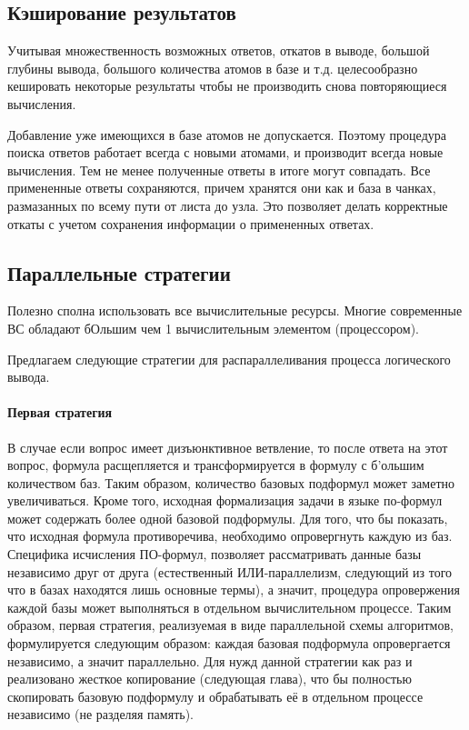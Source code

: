 \subsection{Кэширование результатов}
Учитывая множественность возможных ответов, откатов в выводе, большой глубины вывода, большого количества атомов в базе и т.д. целесообразно кешировать некоторые результаты чтобы не производить снова повторяющиеся вычисления.

Добавление уже имеющихся в базе атомов не допускается. Поэтому процедура поиска ответов работает всегда с новыми атомами, и производит всегда новые вычисления. Тем не менее полученные ответы в итоге могут совпадать. Все примененные ответы сохраняются, причем хранятся они как и база в чанках, размазанных по всему пути от листа до узла. Это позволяет делать корректные откаты с учетом сохранения информации о примененных ответах.

\subsection{Параллельные стратегии}
 
Полезно сполна использовать все вычислительные ресурсы. Многие современные ВС обладают бОльшим чем 1 вычислительным элементом (процессором).

Предлагаем следующие стратегии для распараллеливания процесса логического вывода.

\paragraph{Первая стратегия}

В случае если вопрос имеет дизъюнктивное ветвление, то после ответа на этот вопрос, формула расщепляется и трансформируется в формулу с б'ольшим количеством баз. Таким образом, количество базовых подформул может заметно увеличиваться. Кроме того, исходная формализация задачи в языке по-формул может содержать более одной базовой подформулы. Для того, что бы показать, что исходная формула противоречива, необходимо опровергнуть каждую из баз. Специфика исчисления ПО-формул, позволяет рассматривать данные базы независимо друг от друга (естественный ИЛИ-параллелизм, следующий из того что в базах находятся лишь основные термы), а значит, процедура опровержения каждой базы может выполняться в отдельном вычислительном процессе. Таким образом, первая стратегия, реализуемая в виде параллельной схемы алгоритмов, формулируется следующим образом: каждая базовая подформула опровергается независимо, а значит параллельно. Для нужд данной стратегии как раз и реализовано жесткое копирование (следующая глава), что бы полностью скопировать базовую подформулу и обрабатывать её в отдельном процессе независимо (не разделяя память).

